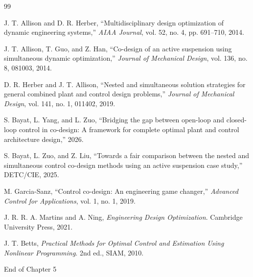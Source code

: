 \documentclass[11pt]{article}
\begin{document}
\begin{thebibliography}{99}

J. T. Allison and D. R. Herber, ``Multidisciplinary design optimization of dynamic engineering systems,'' \emph{AIAA Journal}, vol. 52, no. 4, pp. 691--710, 2014.

J. T. Allison, T. Guo, and Z. Han, ``Co-design of an active suspension using simultaneous dynamic optimization,'' \emph{Journal of Mechanical Design}, vol. 136, no. 8, 081003, 2014.

D. R. Herber and J. T. Allison, ``Nested and simultaneous solution strategies for general combined plant and control design problems,'' \emph{Journal of Mechanical Design}, vol. 141, no. 1, 011402, 2019.

S. Bayat, L. Yang, and L. Zuo, ``Bridging the gap between open-loop and closed-loop control in co-design: A framework for complete optimal plant and control architecture design,'' 2026.

S. Bayat, L. Zuo, and Z. Liu, ``Towards a fair comparison between the nested and simultaneous control co-design methods using an active suspension case study,'' DETC/CIE, 2025.

M. Garcia-Sanz, ``Control co-design: An engineering game changer,'' \emph{Advanced Control for Applications}, vol. 1, no. 1, 2019.

J. R. R. A. Martins and A. Ning, \emph{Engineering Design Optimization}. Cambridge University Press, 2021.

J. T. Betts, \emph{Practical Methods for Optimal Control and Estimation Using Nonlinear Programming}. 2nd ed., SIAM, 2010.

\end{thebibliography}

\vfill
\begin{center}
\small\color{CCDgray}
End of Chapter 5
\end{center}
\end{document}
